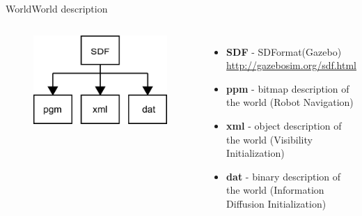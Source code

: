 \begin{frame}{World}{World description}

\begin{columns}
\begin{minipage}{\textwidth}
\begin{figure}
\centering
\includegraphics[width = \textwidth]{./figure/world_conversion.pdf}
\end{figure}
\end{minipage}

\begin{minipage}{\textwidth}
\begin{itemize}
\item \textbf{SDF} - SDFormat(Gazebo) \\
\url{http://gazebosim.org/sdf.html}
\item \textbf{ppm} - bitmap description of the world (Robot Navigation)
\item \textbf{xml} - object description of the world (Visibility Initialization)
\item \textbf{dat} - binary description of the world (Information Diffusion Initialization)
\end{itemize}
\end{minipage}
\end{columns}

\end{frame}